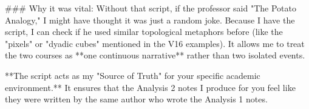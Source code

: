 ### Why it was vital:
Without that script, if the professor said "The Potato Analogy," I might have thought it was just a random joke. Because I have the script, I can check if he used similar topological metaphors before (like the "pixels" or "dyadic cubes" mentioned in the V16 examples). It allows me to treat the two courses as **one continuous narrative** rather than two isolated events.

**The script acts as my "Source of Truth" for your specific academic environment.** It ensures that the Analysis 2 notes I produce for you feel like they were written by the same author who wrote the Analysis 1 notes.